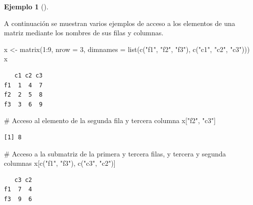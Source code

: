 \documentclass[
  a4paper,
]{scrreport}
\newenvironment{Shaded}{\begin{snugshade}}{\end{snugshade}}
\newcommand{\AttributeTok}[1]{\textcolor[rgb]{0.40,0.45,0.13}{#1}}
\newcommand{\CommentTok}[1]{\textcolor[rgb]{0.37,0.37,0.37}{#1}}
\newcommand{\DecValTok}[1]{\textcolor[rgb]{0.68,0.00,0.00}{#1}}
\newcommand{\FunctionTok}[1]{\textcolor[rgb]{0.28,0.35,0.67}{#1}}
\newcommand{\NormalTok}[1]{\textcolor[rgb]{0.00,0.23,0.31}{#1}}
\newcommand{\OtherTok}[1]{\textcolor[rgb]{0.00,0.23,0.31}{#1}}
\newcommand{\SpecialCharTok}[1]{\textcolor[rgb]{0.37,0.37,0.37}{#1}}
\newcommand{\StringTok}[1]{\textcolor[rgb]{0.13,0.47,0.30}{#1}}
\theoremstyle{definition}
\theoremstyle{definition}
\newtheorem{example}{Ejemplo}[chapter]
\theoremstyle{remark}
\begin{document}
\leavevmode{}%
\begin{example}[]\label{exm-acceso-matriz-nombres}

A continuación se muestran varios ejemplos de acceso a los elementos de
una matriz mediante los nombres de sus filas y columnas.

\begin{Shaded}
\begin{Highlighting}[]
\NormalTok{x }\OtherTok{\textless{}{-}} \FunctionTok{matrix}\NormalTok{(}\DecValTok{1}\SpecialCharTok{:}\DecValTok{9}\NormalTok{, }\AttributeTok{nrow =} \DecValTok{3}\NormalTok{, }\AttributeTok{dimnames =} \FunctionTok{list}\NormalTok{(}\FunctionTok{c}\NormalTok{(}\StringTok{"f1"}\NormalTok{, }\StringTok{"f2"}\NormalTok{, }\StringTok{"f3"}\NormalTok{), }\FunctionTok{c}\NormalTok{(}\StringTok{"c1"}\NormalTok{, }\StringTok{"c2"}\NormalTok{, }\StringTok{"c3"}\NormalTok{)))}
\NormalTok{x}
\end{Highlighting}
\end{Shaded}

\begin{verbatim}
   c1 c2 c3
f1  1  4  7
f2  2  5  8
f3  3  6  9
\end{verbatim}

\begin{Shaded}
\begin{Highlighting}[]
\CommentTok{\# Acceso al elemento de la segunda fila y tercera columna}
\NormalTok{x[}\StringTok{"f2"}\NormalTok{, }\StringTok{"c3"}\NormalTok{]}
\end{Highlighting}
\end{Shaded}

\begin{verbatim}
[1] 8
\end{verbatim}

\begin{Shaded}
\begin{Highlighting}[]
\CommentTok{\# Acceso a la submatriz de la primera y tercera filas, y tercera y segunda columnas}
\NormalTok{x[}\FunctionTok{c}\NormalTok{(}\StringTok{"f1"}\NormalTok{, }\StringTok{"f3"}\NormalTok{), }\FunctionTok{c}\NormalTok{(}\StringTok{"c3"}\NormalTok{, }\StringTok{"c2"}\NormalTok{)]}
\end{Highlighting}
\end{Shaded}

\begin{verbatim}
   c3 c2
f1  7  4
f3  9  6
\end{verbatim}

\end{example}
\end{document}
